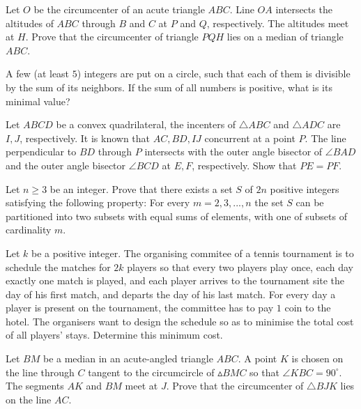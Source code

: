 \documentclass[11pt]{scrartcl}
\begin{document}
\begin{problem}[2139114147569608698]
Let $O$ be the circumcenter of an acute triangle $ABC$. Line $OA$ intersects the altitudes of $ABC$ through $B$ and $C$ at $P$ and $Q$, respectively. The altitudes meet at $H$. Prove that the circumcenter of triangle $PQH$ lies on a median of triangle $ABC$.
\end{problem}
\begin{problem}[616860610609120]
	A few (at least $5$) integers are put on a circle, such that each of them is divisible by the sum of its neighbors. If the sum of all numbers is positive, what is its minimal value?
\end{problem}
\begin{problem}[4308913658510445082]
Let $ABCD$ be a convex quadrilateral, the incenters of $\triangle ABC$ and $\triangle ADC$ are $I,J$, respectively. It is known that $AC,BD,IJ$ concurrent at a point $P$. The line perpendicular to $BD$ through $P$ intersects with the outer angle bisector of $\angle BAD$ and the outer angle bisector $\angle BCD$ at $E,F$, respectively. Show that $PE=PF$.
\end{problem}
\begin{problem}[8059760967121829853]
	Let $n\geqslant 3$ be an integer. Prove that there exists a set $S$ of $2n$ positive integers satisfying the following property: For every $m=2,3,...,n$ the set $S$ can be partitioned into two subsets with equal sums of elements, with one of subsets of cardinality $m$.
\end{problem}
\begin{problem}[8916142707013964275]
	Let $k$ be a positive integer. The organising commitee of a tennis tournament is to schedule the matches for $2k$ players so that every two players play once, each day exactly one match is played, and each player arrives to the tournament site the day of his first match, and departs the day of his last match. For every day a player is present on the tournament, the committee has to pay $1$ coin to the hotel. The organisers want to design the schedule so as to minimise the total cost of all players' stays. Determine this minimum cost.
\end{problem}
\begin{problem}[1891712635906763103]
	Let $BM$ be a median in an acute-angled triangle $ABC$. A point $K$ is chosen on the line through $C$ tangent to the circumcircle of $\vartriangle BMC$ so that $\angle KBC = 90^\circ$. The segments $AK$ and $BM$ meet at $J$. Prove that the circumcenter of $\triangle BJK$ lies on the line $AC$.
\end{problem}
\end{document}
